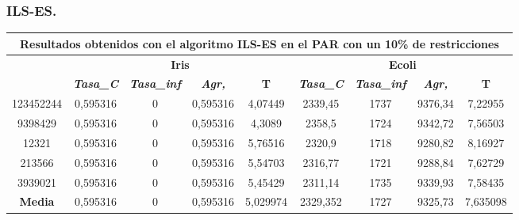 \documentclass[12pt, spanish]{article}
\begin{document}
\subsubsection{ILS-ES.}

\begin{table}[H]
\begin{tabular}{|c|c|c|c|c|c|c|c|c|}
\hline
\multicolumn{9}{|c|}{\textbf{Resultados obtenidos con el algoritmo ILS-ES en el PAR con un 10\% de restricciones}}                                                                                                \\ \hline
\multirow{2}{*}{} & \multicolumn{4}{c|}{\textbf{Iris}}                                                            & \multicolumn{4}{c|}{\textbf{Ecoli}}                                                           \\ \cline{2-9} 
                  & \textit{\textbf{Tasa\_C}} & \textit{\textbf{Tasa\_inf}} & \textit{\textbf{Agr,}} & \textbf{T} & \textit{\textbf{Tasa\_C}} & \textit{\textbf{Tasa\_inf}} & \textit{\textbf{Agr,}} & \textbf{T} \\ \hline
123452244         & 0,595316                  & 0                           & 0,595316               & 4,07449    & 2339,45                   & 1737                        & 9376,34                & 7,22955    \\ \hline
9398429           & 0,595316                  & 0                           & 0,595316               & 4,3089     & 2358,5                    & 1724                        & 9342,72                & 7,56503    \\ \hline
12321             & 0,595316                  & 0                           & 0,595316               & 5,76516    & 2320,9                    & 1718                        & 9280,82                & 8,16927    \\ \hline
213566            & 0,595316                  & 0                           & 0,595316               & 5,54703    & 2316,77                   & 1721                        & 9288,84                & 7,62729    \\ \hline
3939021           & 0,595316                  & 0                           & 0,595316               & 5,45429    & 2311,14                   & 1735                        & 9339,93                & 7,58435    \\ \hline
\textbf{Media}    & 0,595316                  & 0                           & 0,595316               & 5,029974   & 2329,352                  & 1727                        & 9325,73                & 7,635098   \\ \hline
\end{tabular}
\end{table}
\end{document}
